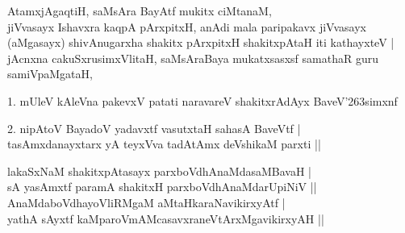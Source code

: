 \begin{entry}
\end{entry}

\begin{entry}
\gl{}
\info{}{}{}{}
\begin{shl}
AtamxjAgaqtiH, saMsAra BayAtf mukitx ciMtanaM,\\
jiVvasayx Ishavxra kaqpA pArxpitxH, anAdi mala paripakavx jiVvasayx\\
(aMgasayx) shivAnugarxha shakitx pArxpitxH shakitxpAtaH iti kathayxteV |\\
jAcnxna cakuSxrusimxVlitaH, saMsAraBaya mukatxsasxsf samathaR guru samiVpaMgataH,
\end{shl}
\begin{shl}
1. mUleV kAleVna pakevxV patati naravareV shakitxrAdAyx BaveV\char'263simxnf
\end{shl}
\begin{shl}
2. nipAtoV BayadoV yadavxtf vasutxtaH sahasA BaveVtf |\\
tasAmxdanayxtarx yA teyxVva tadAtAmx deVshikaM parxti ||
\end{shl}
\end{entry}

\begin{entry}
\begin{shl}
lakaSxNaM shakitxpAtasayx parxboVdhAnaMdasaMBavaH |\\
sA yasAmxtf paramA shakitxH parxboVdhAnaMdarUpiNiV ||\\
AnaMdaboVdhayoVliRMgaM aMtaHkaraNavikirxyAtf |\\
yathA sAyxtf kaMparoVmAMcasavxraneVtArxMgavikirxyAH ||
\end{shl}
\end{entry}

